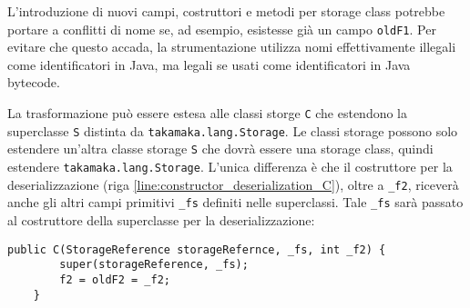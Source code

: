 L'introduzione di nuovi campi, costruttori e metodi per storage class potrebbe portare a conflitti di nome se, ad esempio, esistesse già un campo \lstinline|oldF1|. Per evitare che questo accada, la strumentazione utilizza nomi effettivamente illegali come identificatori in Java, ma legali se usati come identificatori in Java bytecode.

La trasformazione può essere estesa alle classi storge \lstinline|C| che estendono la superclasse \lstinline|S| distinta da \lstinline|takamaka.lang.Storage|. Le classi storage possono solo estendere un'altra classe storage \lstinline|S| che dovrà essere una storage class, quindi estendere \lstinline|takamaka.lang.Storage|. L'unica differenza è che il costruttore per la deserializzazione (riga \ref{line:constructor_deserialization_C}), oltre a \lstinline|_f2|, riceverà anche gli altri campi primitivi \lstinline|_fs| definiti nelle superclassi. Tale \lstinline|_fs| sarà passato al costruttore della superclasse per la deserializzazione:
%
\begin{lstlisting}[numbers=none,frame=none]
	public C(StorageReference storageRefernce, _fs, int _f2) {
		super(storageReference, _fs);
		f2 = oldF2 = _f2;
	}
\end{lstlisting}
%
